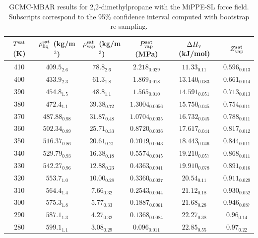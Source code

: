 \documentclass[journal=jctc,manuscript=article]{achemso}
\begin{document}
\begin{table}[htb!]
	\caption{GCMC-MBAR results for 2,2-dimethylpropane with the MiPPE-SL force field. Subscripts correspond to the 95\% confidence interval computed with bootstrap re-sampling.}
	\begin{center}
		\begin{tabular}{|c|c|c|c|c|c|}
			\hline
			$T^{\rm sat}$ (K) & $\rho_{\rm liq}^{\rm sat}$ (kg/m$^3$) & $\rho_{\rm vap}^{\rm sat}$ (kg/m$^3$) & $P_{\rm vap}^{\rm sat}$ (MPa) & $\Delta H_{\rm v}$ (kJ/mol) & $Z_{\rm vap}^{\rm sat}$ \\ \hline
            410 & $409.5_{2.6}$ & $78.8_{2.6}$ & $2.218_{0.029}$ & $11.33_{0.11}$ & $0.596_{0.013}$ \\
            400 & $433.9_{2.3}$ & $61.3_{1.8}$ & $1.869_{0.018}$ & $13.140_{0.083}$ & $0.661_{0.014}$ \\
            390 & $454.8_{1.5}$ & $48.8_{1.1}$ & $1.565_{0.010}$ & $14.591_{0.051}$ & $0.713_{0.013}$ \\
            380 & $472.4_{1.1}$ & $39.38_{0.72}$ & $1.3004_{0.0056}$ & $15.750_{0.045}$ & $0.754_{0.011}$ \\
            370 & $487.88_{0.98}$ & $31.87_{0.48}$ & $1.0704_{0.0035}$ & $16.732_{0.045}$ & $0.788_{0.011}$ \\
            360 & $502.34_{0.89}$ & $25.71_{0.33}$ & $0.8720_{0.0036}$ & $17.617_{0.044}$ & $0.817_{0.012}$ \\
            350 & $516.37_{0.86}$ & $20.61_{0.21}$ & $0.7019_{0.0043}$ & $18.443_{0.046}$ & $0.844_{0.011}$ \\
            340 & $529.79_{0.93}$ & $16.38_{0.18}$ & $0.5574_{0.0045}$ & $19.210_{0.057}$ & $0.868_{0.011}$ \\
            330 & $542.27_{0.96}$ & $12.88_{0.23}$ & $0.4363_{0.0041}$ & $19.910_{0.078}$ & $0.891_{0.016}$ \\
            320 & $553.7_{1.0}$ & $10.00_{0.28}$ & $0.3360_{0.0037}$ & $20.54_{0.11}$ & $0.911_{0.029}$ \\
            310 & $564.4_{1.4}$ & $7.66_{0.32}$ & $0.2543_{0.0044}$ & $21.12_{0.18}$ & $0.930_{0.052}$ \\
            300 & $575.3_{1.8}$ & $5.77_{0.33}$ & $0.1887_{0.0061}$ & $21.68_{0.28}$ & $0.946_{0.087}$ \\
            290 & $587.1_{1.3}$ & $4.27_{0.32}$ & $0.1368_{0.0084}$ & $22.27_{0.38}$ & $0.96_{0.14}$ \\
            280 & $599.1_{1.1}$ & $3.08_{0.29}$ & $0.096_{0.011}$ & $22.85_{0.55}$ & $0.97_{0.22}$ \\
			\hline
		\end{tabular}
	\end{center}
\end{table}
\end{document}
